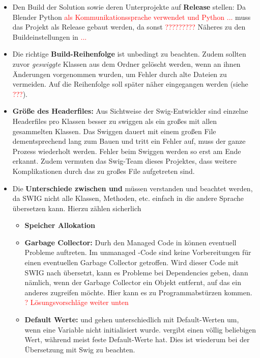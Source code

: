 \begin{itemize}
\item Den Build der Solution sowie deren Unterprojekte auf \textbf{Release} stellen: Da Blender Python \textcolor{red}{als Kommunikationssprache verwendet und Python ...} muss das Projekt als Release gebaut werden, da sonst \textcolor{red}{?????????} Näheres zu den Buildeinstellungen in \textcolor{red}{...}
\item Die richtige \textbf{Build-Reihenfolge} ist unbedingt zu beachten. Zudem sollten zuvor \emph{geswiggte} Klassen aus dem Ordner gelöscht werden, wenn an ihnen Änderungen vorgenommen wurden, um Fehler durch alte Dateien zu vermeiden. Auf die Reihenfolge soll später näher eingegangen werden (siehe \textcolor{red}{???}).
\item \textbf{Größe des Headerfiles:} Aus Sichtweise der Swig-Entwickler sind einzelne Headerfiles pro Klassen besser zu swiggen als ein großes mit allen gesammelten Klassen. Das Swiggen dauert mit einem großen File dementsprechend lang zum Bauen und tritt ein Fehler auf, muss der ganze Prozess wiederholt werden. Fehler beim Swiggen werden so erst am Ende erkannt. Zudem vermuten das Swig-Team dieses Projektes, dass weitere Komplikationen durch das zu großes File aufgetreten sind. 
\item Die \textbf{Unterschiede zwischen \CC und \CS} müssen verstanden und beachtet werden, da SWIG nicht alle Klassen, Methoden, etc. einfach in die andere Sprache übersetzen kann. Hierzu zählen sicherlich 
	\begin{itemize}
	\item \textbf{Speicher Allokation}
	\item \textbf{Garbage Collector:} Durh den Managed Code in \CS können eventuell Probleme auftreten. Im unmanaged \CC -Code sind keine Vorbereitungen für einen eventuellen Garbage Collector getroffen. Wird dieser Code mit SWIG nach \CS übersetzt, kann es Probleme bei Dependencies geben, dann nämlich, wenn der Garbage Collector ein Objekt entfernt, auf das ein anderes zugreifen möchte. Hier kann es zu Programmabstürzen kommen. \textcolor{red}{? Lösungsvorschläge weiter unten}
	\item \textbf{Default Werte:} \CC und \CS gehen unterschiedlich mit Default-Werten um, wenn eine Variable nicht initialisiert wurde. \CC vergibt einen völlig beliebigen Wert, während \CS meist feste Default-Werte hat. Dies ist wiederum bei der Übersetzung mit Swig zu beachten. 

\end{itemize}
\end{itemize}
